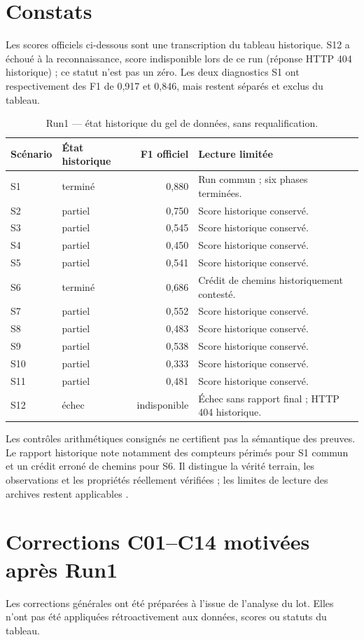 \documentclass[11pt,a4paper]{article}
\begin{document}
\section{Constats}
Les scores officiels ci-dessous sont une transcription du tableau historique. S12 a échoué à la reconnaissance, score indisponible lors de ce run (réponse HTTP 404 historique) ; ce statut n'est pas un zéro. Les deux diagnostics S1 ont respectivement des F1 de 0,917 et 0,846, mais restent séparés et exclus du tableau.
\begin{table}[ht]
\centering\small
\caption{Run1 — état historique du gel de données, sans requalification.}\label{tab:run1}
\begin{tabularx}{\linewidth}{@{}l l r Y@{}}\toprule
Scénario & État historique & F1 officiel & Lecture limitée \\\midrule
S1 & terminé & 0,880 & Run commun ; six phases terminées.\\
S2 & partiel & 0,750 & Score historique conservé.\\
S3 & partiel & 0,545 & Score historique conservé.\\
S4 & partiel & 0,450 & Score historique conservé.\\
S5 & partiel & 0,541 & Score historique conservé.\\
S6 & terminé & 0,686 & Crédit de chemins historiquement contesté.\\
S7 & partiel & 0,552 & Score historique conservé.\\
S8 & partiel & 0,483 & Score historique conservé.\\
S9 & partiel & 0,538 & Score historique conservé.\\
S10 & partiel & 0,333 & Score historique conservé.\\
S11 & partiel & 0,481 & Score historique conservé.\\
S12 & échec & indisponible & Échec sans rapport final ; HTTP 404 historique.\\
\bottomrule\end{tabularx}
\end{table}

Les contrôles arithmétiques consignés ne certifient pas la sémantique des preuves. Le rapport historique note notamment des compteurs périmés pour S1 commun et un crédit erroné de chemins pour S6. Il distingue la vérité terrain, les observations et les propriétés réellement vérifiées ; les limites de lecture des archives restent applicables \cite{base}.
\section{Corrections C01–C14 motivées après Run1}
Les corrections générales ont été préparées à l'issue de l'analyse du lot. Elles n'ont pas été appliquées rétroactivement aux données, scores ou statuts du tableau.
\end{document}
